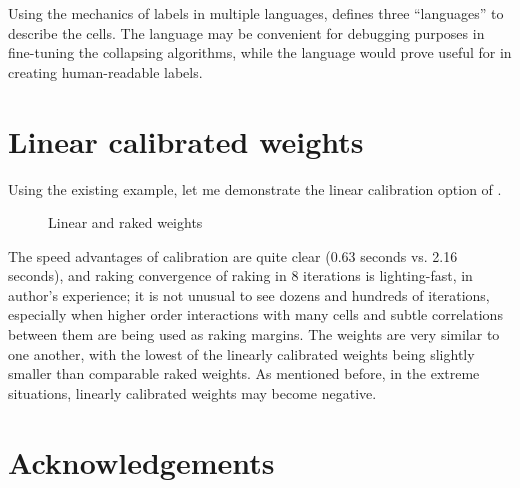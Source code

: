 Using the mechanics of labels in multiple languages,  defines three
``languages'' to describe the cells. The language  may be convenient
for debugging purposes in fine-tuning the collapsing algorithms, while the language
 would prove useful for  in creating human-readable
labels.

\section{Linear calibrated weights}
\label{subsec:linear}

Using the existing example, let me demonstrate the linear calibration option of
.

\begin{stlog}
\nullskip
\end{stlog}

\begin{figure}[h!]
    \begin{center}
    \end{center}
    \caption{Linear and raked weights}
    \label{fig:linear:raked}
\end{figure}

The speed advantages of  calibration are quite clear (0.63 seconds vs. 2.16 seconds),
and raking convergence of raking in 8 iterations is lighting-fast, in author's experience;
it is not unusual to see dozens and hundreds of iterations, especially when higher order
interactions with many cells and subtle correlations between them are being used as
raking margins.
The weights are very similar to one another, with the lowest of the linearly
calibrated weights being slightly smaller than comparable raked weights.
As mentioned before, in the extreme situations, linearly calibrated weights
may become negative.


















\section*{Acknowledgements}


